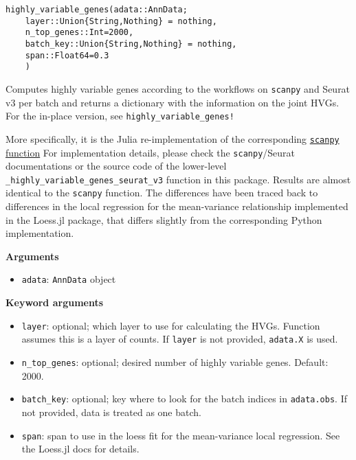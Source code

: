 \documentclass[oneside]{memoir}
\begin{document}
\begin{adjustwidth}{2em}{0pt}


\begin{verbatim}
highly_variable_genes(adata::AnnData;
    layer::Union{String,Nothing} = nothing,
    n_top_genes::Int=2000,
    batch_key::Union{String,Nothing} = nothing,
    span::Float64=0.3
    )
\end{verbatim}

Computes highly variable genes according to the workflows on \texttt{scanpy} and Seurat v3 per batch and returns a dictionary with  the information on the joint HVGs. For the in-place version, see \texttt{highly\_variable\_genes!}

More specifically, it is the Julia re-implementation of the corresponding  \href{https://github.com/scverse/scanpy/blob/master/scanpy/preprocessing/\_highly\_variable\_genes.py}{\texttt{scanpy} function} For implementation details, please check the \texttt{scanpy}/Seurat documentations or the source code of the  lower-level \texttt{\_highly\_variable\_genes\_seurat\_v3} function in this package.  Results are almost identical to the \texttt{scanpy} function. The differences have been traced back to differences in  the local regression for the mean-variance relationship implemented in the Loess.jl package, that differs slightly  from the corresponding Python implementation. 

\textbf{Arguments}

\begin{itemize}
\item \texttt{adata}: \texttt{AnnData} object 

\end{itemize}
\textbf{Keyword arguments}

\begin{itemize}
\item \texttt{layer}: optional; which layer to use for calculating the HVGs. Function assumes this is a layer of counts. If \texttt{layer} is not provided, \texttt{adata.X} is used. 


\item \texttt{n\_top\_genes}: optional; desired number of highly variable genes. Default: 2000. 


\item \texttt{batch\_key}: optional; key where to look for the batch indices in \texttt{adata.obs}. If not provided, data is treated as one batch. 


\item \texttt{span}: span to use in the loess fit for the mean-variance local regression. See the Loess.jl docs for details. 



\end{itemize}
\end{adjustwidth}
\end{document}

